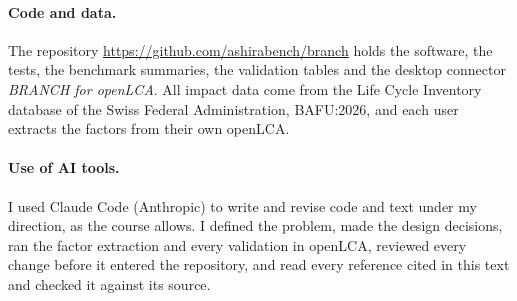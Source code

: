 \documentclass{article}
\newcommand{\repo}{\url{https://github.com/ashirabench/branch}}
\begin{document}
\paragraph{Code and data.}
The repository \repo{} holds the software, the tests, the benchmark summaries, the validation
tables and the desktop connector \emph{BRANCH for openLCA}. All impact data come from the Life Cycle
Inventory database of the Swiss Federal Administration, BAFU:2026, and each user extracts the factors
from their own openLCA.

\paragraph{Use of AI tools.}
I used Claude Code (Anthropic) to write and revise code and text under my direction, as the course
allows. I defined the problem, made the design decisions, ran the factor extraction and every validation
in openLCA, reviewed every change before it entered the repository, and read every reference cited in
this text and checked it against its source.


\end{document}
